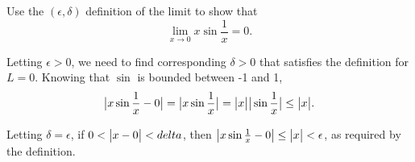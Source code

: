 \begin{example}
	Use the $(\epsilon, \delta)$ definition of the limit to show that
	\begin{equation*}
		\lim_{x\to 0}{x\sin{\frac{1}{x}}} = 0.
	\end{equation*}
\end{example}
\begin{answer}
	Letting $\epsilon > 0$, we need to find corresponding $\delta > 0$ that satisfies the definition for $L = 0$.
	Knowing that $\sin$ is bounded between -1 and 1,
	\begin{equation*}
		\big\lvert x\sin{\frac{1}{x}} - 0 \big\rvert = \big\lvert x\sin{\frac{1}{x}} \big\rvert = \big\lvert x \big\rvert\big\lvert \sin{\frac{1}{x}} \big\rvert \leq \big\lvert x \big\rvert.
	\end{equation*}
	
	Letting $\delta = \epsilon$, if $0 < \big\lvert x - 0 \big\rvert < delta$, then $\big\lvert x\sin{\frac{1}{x}} - 0 \big\rvert \leq \big\lvert x \big\rvert < \epsilon$, as required by the definition.
\end{answer}